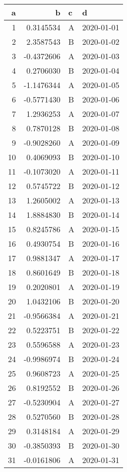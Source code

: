 
\begin{tabular}{r|r|l|l}
\hline
a & b & c & d\\
\hline
1 & 0.3145534 & A & 2020-01-01\\
\hline
2 & 2.3587543 & B & 2020-01-02\\
\hline
3 & -0.4372606 & A & 2020-01-03\\
\hline
4 & 0.2706030 & B & 2020-01-04\\
\hline
5 & -1.1476344 & A & 2020-01-05\\
\hline
6 & -0.5771430 & B & 2020-01-06\\
\hline
7 & 1.2936253 & A & 2020-01-07\\
\hline
8 & 0.7870128 & B & 2020-01-08\\
\hline
9 & -0.9028260 & A & 2020-01-09\\
\hline
10 & 0.4069093 & B & 2020-01-10\\
\hline
11 & -0.1073020 & A & 2020-01-11\\
\hline
12 & 0.5745722 & B & 2020-01-12\\
\hline
13 & 1.2605002 & A & 2020-01-13\\
\hline
14 & 1.8884830 & B & 2020-01-14\\
\hline
15 & 0.8245786 & A & 2020-01-15\\
\hline
16 & 0.4930754 & B & 2020-01-16\\
\hline
17 & 0.9881347 & A & 2020-01-17\\
\hline
18 & 0.8601649 & B & 2020-01-18\\
\hline
19 & 0.2020801 & A & 2020-01-19\\
\hline
20 & 1.0432106 & B & 2020-01-20\\
\hline
21 & -0.9566384 & A & 2020-01-21\\
\hline
22 & 0.5223751 & B & 2020-01-22\\
\hline
23 & 0.5596588 & A & 2020-01-23\\
\hline
24 & -0.9986974 & B & 2020-01-24\\
\hline
25 & 0.9608723 & A & 2020-01-25\\
\hline
26 & 0.8192552 & B & 2020-01-26\\
\hline
27 & -0.5230904 & A & 2020-01-27\\
\hline
28 & 0.5270560 & B & 2020-01-28\\
\hline
29 & 0.3148184 & A & 2020-01-29\\
\hline
30 & -0.3850393 & B & 2020-01-30\\
\hline
31 & -0.0161806 & A & 2020-01-31\\

\end{tabular}
